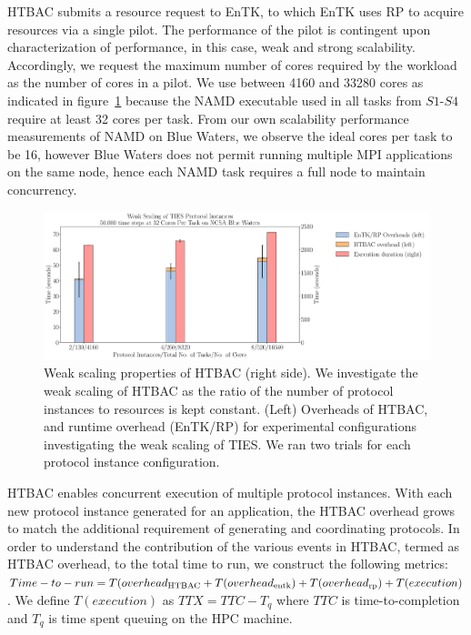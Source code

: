 HTBAC submits a resource request to EnTK, to which EnTK uses 
RP to acquire resources via a single pilot. The performance of 
the pilot is contingent upon characterization of 
performance, in this case, weak and strong scalability. Accordingly, we request the maximum number of cores required
by the workload as the number of cores in a pilot. We use between
4160 and 33280 cores as indicated in figure~\ref{fig:weak_scaling}
because the NAMD executable used in all tasks from $S1$-$S4$ require at 
least 32 cores per task. From our own scalability performance measurements of 
NAMD on Blue Waters, we observe the ideal cores per task to be 16,
however Blue Waters does not permit running multiple MPI applications on the same node, 
hence each NAMD task requires a full node to maintain concurrency.

\begin{figure}
  \centering
   \includegraphics[width=\columnwidth]{./figures/weak_scaling_TIES_instances_50,000_timesteps.pdf}
  \caption{Weak scaling properties of HTBAC (right side). We investigate the
  weak scaling of HTBAC as the ratio of the number of protocol instances to
  resources is kept constant. (Left) Overheads of HTBAC, and runtime overhead (EnTK/RP) for
  experimental configurations investigating the weak scaling of TIES. We ran two trials for each protocol instance configuration.}
\label{fig:weak_scaling}
\end{figure}


HTBAC enables concurrent execution of multiple protocol instances. 
With each new protocol instance generated for an 
application, the HTBAC overhead grows to match the additional
requirement of generating and coordinating protocols. In order
to understand the contribution of the various events in HTBAC, 
termed as HTBAC overhead, to the total time to run, we construct the following metrics:
\(Time-to-run = T(overhead\textsubscript{HTBAC} + 
T(overhead\textsubscript{entk}) + 
T(overhead\textsubscript{rp}) + T(execution)\). We define \(T(execution)\) as \(TTX = TTC - T_q\) where \(TTC\) is
time-to-completion and \(T_q\) is time spent queuing on the HPC machine. 

